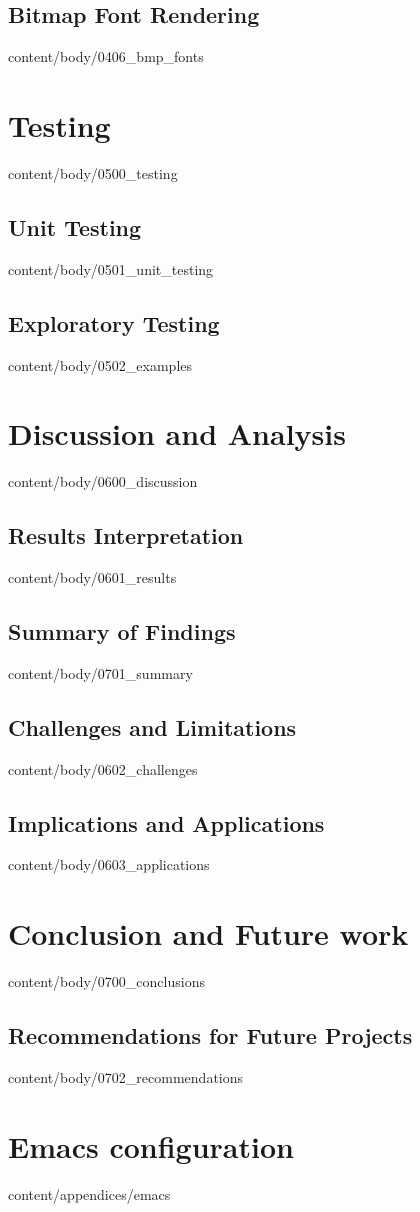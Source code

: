 \documentclass[english, tfg, loc, lof, covers, printable, firstnumbered, epsbased]{tfgtfmthesisuam}
\begin{document}
  \section{Bitmap Font Rendering}{content/body/0406_bmp_fonts}                      %

\chapter{Testing}{content/body/0500_testing}                                        %
  \section{Unit Testing}{content/body/0501_unit_testing}                            %
  \section{Exploratory Testing}{content/body/0502_examples}                         %

\chapter{Discussion and Analysis}{content/body/0600_discussion}                     %
  \section{Results Interpretation}{content/body/0601_results}                       %
  \section{Summary of Findings}{content/body/0701_summary}                          %
  \section{Challenges and Limitations}{content/body/0602_challenges}                %
  \section{Implications and Applications}{content/body/0603_applications}           %
  
\chapter{Conclusion and Future work}{content/body/0700_conclusions}                 %
  \section{Recommendations for Future Projects}{content/body/0702_recommendations}  %

\appendix

\chapter{Emacs configuration}{content/appendices/emacs}
\end{document}
